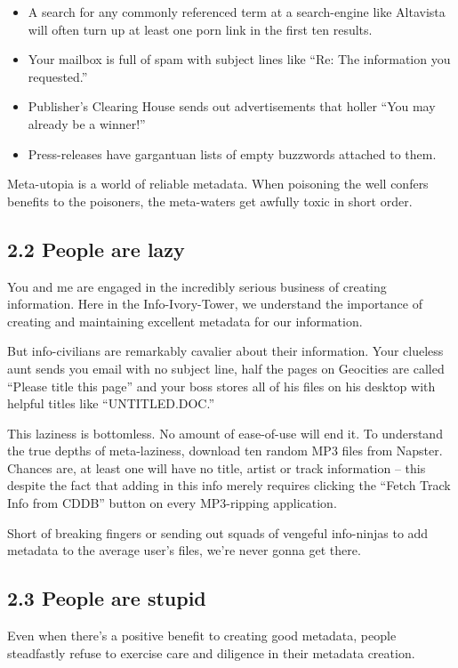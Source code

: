 \begin{itemize}
\item
  A search for any commonly referenced term at a search-engine like
  Altavista will often turn up at least one porn link in the first
  ten results.
\item
  Your mailbox is full of spam with subject lines like ``Re: The
  information you requested.''
\item
  Publisher's Clearing House sends out advertisements that holler
  ``You may already be a winner!''
\item
  Press-releases have gargantuan lists of empty buzzwords attached to
  them.
\end{itemize}
Meta-utopia is a world of reliable metadata. When poisoning the
well confers benefits to the poisoners, the meta-waters get awfully
toxic in short order.

\subsection{2.2 People are lazy}

You and me are engaged in the incredibly serious business of
creating information. Here in the Info-Ivory-Tower, we understand
the importance of creating and maintaining excellent metadata for
our information.

But info-civilians are remarkably cavalier about their information.
Your clueless aunt sends you email with no subject line, half the
pages on Geocities are called ``Please title this page'' and your
boss stores all of his files on his desktop with helpful titles
like ``UNTITLED.DOC.''

This laziness is bottomless. No amount of ease-of-use will end it.
To understand the true depths of meta-laziness, download ten random
MP3 files from Napster. Chances are, at least one will have no
title, artist or track information -- this despite the fact that
adding in this info merely requires clicking the ``Fetch Track Info
from CDDB'' button on every MP3-ripping application.

Short of breaking fingers or sending out squads of vengeful
info-ninjas to add metadata to the average user's files, we're
never gonna get there.

\subsection{2.3 People are stupid}

Even when there's a positive benefit to creating good metadata,
people steadfastly refuse to exercise care and diligence in their
metadata creation.

